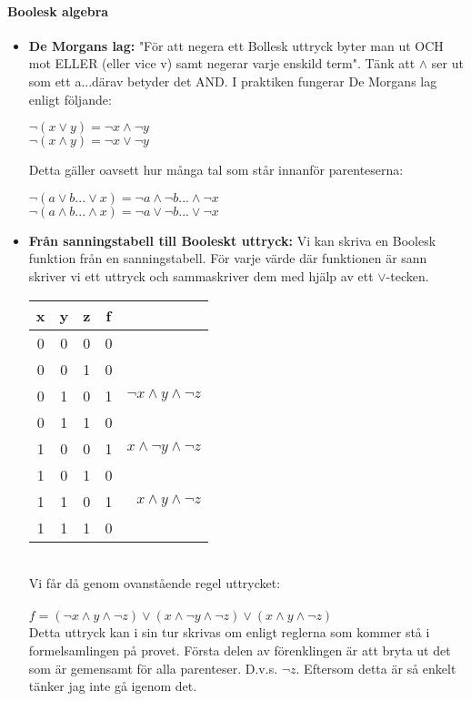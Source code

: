 \documentclass[a4paper]{article}
\begin{document}
\paragraph{Boolesk algebra}
\begin{itemize}
\item \textbf{De Morgans lag:} "För att negera ett Bollesk uttryck byter man ut OCH mot ELLER (eller vice v) samt negerar varje enskild term". Tänk att $\land$ ser ut som ett a...därav betyder det AND. I praktiken fungerar De Morgans lag enligt följande: 

$\lnot(x \lor y) = \lnot x \land \lnot y$\\
$\lnot(x \land y) = \lnot x \lor \lnot y$

Detta gäller oavsett hur många tal som står innanför parenteserna:

$\lnot(a \lor b ... \lor x) = \lnot a \land \lnot b ... \land \lnot x$\\
$\lnot(a \land b ... \land x) = \lnot a \lor \lnot b ... \lor \lnot x$\\

\item \textbf{Från sanningstabell till Booleskt uttryck:} Vi kan skriva en Boolesk funktion från en sanningstabell. För varje värde där funktionen är sann skriver vi ett uttryck och sammaskriver dem med hjälp av ett $\lor$-tecken.

\begin{tabular}{ c c c | c r }

x & y & z & f & \\ \hline
0 & 0 & 0 & 0 &\\
0 & 0 & 1 & 0 &\\
0 & 1 & 0 & 1 & $\lnot x \land y \land \lnot z$\\
0 & 1 & 1 & 0 &\\
1 & 0 & 0 & 1 & $x \land \lnot y \land \lnot z$\\
1 & 0 & 1 & 0 &\\
1 & 1 & 0 & 1 & $x \land y \land \lnot z$\\
1 & 1 & 1 & 0 &

\end{tabular}\\

Vi får då genom ovanstående regel uttrycket:\\ 
\\$f = (\lnot x \land y \land \lnot z) \lor (x \land \lnot y \land \lnot z) \lor (x \land y \land \lnot z)$\\

Detta uttryck kan i sin tur skrivas om enligt reglerna som kommer stå i formelsamlingen på provet. Första delen av förenklingen är att bryta ut det som är gemensamt för alla parenteser. D.v.s. $\lnot z$. Eftersom detta är så enkelt tänker jag inte gå igenom det.
\end{itemize}
\end{document}
